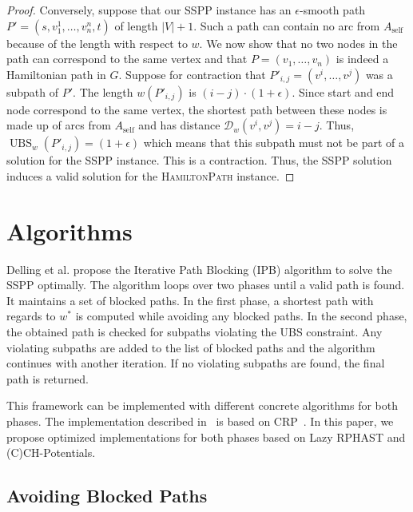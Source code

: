 \documentclass[a4paper,UKenglish,cleveref, autoref, thm-restate]{lipics-v2021}
\newcommand*{\dist}{\mathcal{D}}
\newcommand*{\ubs}{\operatorname{UBS}}
\begin{document}
\begin{proof}
Conversely, suppose that our SSPP instance has an $\epsilon$-smooth path $P' = (s, v_1^1, \dots, v_n^n, t)$ of length $|V|+1$.
Such a path can contain no arc from $A_{\operatorname{self}}$ because of the length with respect to $w$.
We now show that no two nodes in the path can correspond to the same vertex and that $P = (v_1, \dots, v_n)$ is indeed a Hamiltonian path in $G$.
Suppose for contraction that $P'_{i,j} = (v^i, \dots, v^j)$ was a subpath of $P'$.
The length $w(P'_{i,j})$ is $(i-j) \cdot (1+\epsilon)$.
Since start and end node correspond to the same vertex, the shortest path between these nodes is made up of arcs from $A_{\operatorname{self}}$ and has distance $\dist_w(v^i, v^j) = i-j$.
Thus, $\ubs_w(P'_{i,j}) = (1+\epsilon)$ which means that this subpath must not be part of a solution for the SSPP instance.
This is a contraction.
Thus, the SSPP solution induces a valid solution for the \textsc{HamiltonPath} instance.
\end{proof}

\section{Algorithms}

Delling et al. propose the Iterative Path Blocking (IPB) algorithm to solve the SSPP optimally.
The algorithm loops over two phases until a valid path is found.
It maintains a set of blocked paths.
In the first phase, a shortest path with regards to $w^*$ is computed while avoiding any blocked paths.
In the second phase, the obtained path is checked for subpaths violating the UBS constraint.
Any violating subpaths are added to the list of blocked paths and the algorithm continues with another iteration.
If no violating subpaths are found, the final path is returned.

This framework can be implemented with different concrete algorithms for both phases.
The implementation described in~\cite{dss-tarrn-18} is based on CRP~\cite{dgpw-crprn-13}.
In this paper, we propose optimized implementations for both phases based on Lazy RPHAST and (C)CH-Potentials.

\subsection{Avoiding Blocked Paths}
\end{document}
